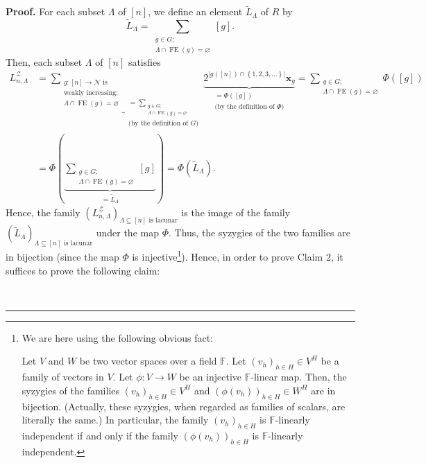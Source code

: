 \documentclass[numbers=enddot,12pt,final,onecolumn,notitlepage]{scrartcl}%
\theoremstyle{definition}
\newenvironment{proof}[1][Proof]{\noindent\textbf{#1.} }{\ \rule{0.5em}{0.5em}}
\newenvironment{verlong}{}{}
\let\sumnonlimits\sum
\renewcommand{\sum}{\sumnonlimits\limits}
\begin{document}
\begin{verlong}
\begin{proof}
For each subset $\Lambda$ of $\left[  n\right]  $, we define an element
$\widetilde{L}_{\Lambda}$ of $R$ by%
\[
\widetilde{L}_{\Lambda}=\sum_{\substack{g\in G;\\\Lambda\cap\operatorname*{FE}%
\left(  g\right)  =\varnothing}}\left[  g\right]  .
\]
Then, each subset $\Lambda$ of $\left[  n\right]  $ satisfies%
\begin{align*}
L_{n,\Lambda}^{\mathcal{Z}}  &  =\underbrace{\sum_{\substack{g:\left[
n\right]  \rightarrow\mathcal{N}\text{ is}\\\text{weakly increasing;}%
\\\Lambda\cap\operatorname*{FE}\left(  g\right)  =\varnothing}}}%
_{\substack{=\sum_{\substack{g\in G;\\\Lambda\cap\operatorname*{FE}\left(
g\right)  =\varnothing}}\\\text{(by the definition of }G\text{)}%
}}\underbrace{2^{\left\vert g\left(  \left[  n\right]  \right)  \cap\left\{
1,2,3,\ldots\right\}  \right\vert }\mathbf{x}_{g}}_{\substack{=\Phi\left(
\left[  g\right]  \right)  \\\text{(by the definition of }\Phi\text{)}}%
}=\sum_{\substack{g\in G;\\\Lambda\cap\operatorname*{FE}\left(  g\right)
=\varnothing}}\Phi\left(  \left[  g\right]  \right) \\
&  =\Phi\left(  \underbrace{\sum_{\substack{g\in G;\\\Lambda\cap
\operatorname*{FE}\left(  g\right)  =\varnothing}}\left[  g\right]
}_{=\widetilde{L}_{\Lambda}}\right)  =\Phi\left(  \widetilde{L}_{\Lambda
}\right)  .
\end{align*}
Hence, the family $\left(  L_{n,\Lambda}^{\mathcal{Z}}\right)  _{\Lambda
\subseteq\left[  n\right]  \text{ is lacunar}}$ is the image of the family
$\left(  \widetilde{L}_{\Lambda}\right)  _{\Lambda\subseteq\left[  n\right]
\text{ is lacunar}}$ under the map $\Phi$. Thus, the syzygies of the two
families are in bijection (since the map $\Phi$ is injective\footnote{We are
here using the following obvious fact:
\par
Let $V$ and $W$ be two vector spaces over a field $\mathbb{F}$. Let $\left(
v_{h}\right)  _{h\in H}\in V^{H}$ be a family of vectors in $V$. Let
$\phi:V\rightarrow W$ be an injective $\mathbb{F}$-linear map. Then, the
syzygies of the families $\left(  v_{h}\right)  _{h\in H}\in V^{H}$ and
$\left(  \phi\left(  v_{h}\right)  \right)  _{h\in H}\in W^{H}$ are in bijection.
(Actually, these syzygies, when regarded as families of scalars, are literally
the same.) In particular, the family $\left(  v_{h}\right)  _{h\in H}$ is
$\mathbb{F}$-linearly independent if and only if the family $\left(  \phi\left(
v_{h}\right)  \right)  _{h\in H}$ is $\mathbb{F}$-linearly independent.}).
Hence, in order to prove Claim 2, it suffices to prove the following claim:


\end{proof}
\end{verlong}
\end{document}
